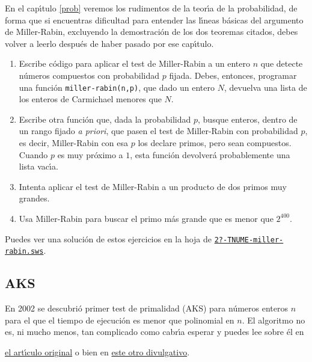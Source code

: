 {\sc En el cap\'{\i}tulo \ref{prob} veremos los rudimentos de la teor\'{\i}a de la probabilidad,} de forma que si  encuentras dificultad para entender las l\'{\i}neas b\'asicas del argumento de Miller-Rabin, excluyendo la demostraci\'on de los dos teoremas citados,  debes volver a leerlo despu\'es de haber pasado por ese cap\'{\i}tulo.

\bigskip

\pagebreak[3]

\begin{ejer}
\begin{enumerate}
\item Escribe c\'odigo para aplicar el test de Miller-Rabin a un entero $n$ que
detecte n\'umeros compuestos con probabilidad $p$ fijada. Debes, entonces,
programar
una funci\'on {\tt miller-rabin(n,p)}, que dado un 
entero $N$,  devuelva una lista
de los enteros de Carmichael menores que $N$.
\item Escribe otra funci\'on que, dada la probabilidad $p$,  busque enteros,
dentro de un rango fijado {\itshape a priori},  que pasen el test de
Miller-Rabin con probabilidad $p$, es decir,
Miller-Rabin con esa $p$ los declare primos, pero sean compuestos. Cuando $p$ es
muy pr\'oximo a $1$, esta funci\'on devolver\'a probablemente una lista
vac\'{\i}a. 
\item Intenta aplicar el test de Miller-Rabin a un producto de dos primos muy
grandes. 
\item Usa Miller-Rabin para buscar el primo m\'as grande que es menor que
$2^{400}$.
\end{enumerate}
\bigskip

Puedes ver una soluci\'on de estos ejercicios en la hoja de {\sage}
\href{http://sage.mat.uam.es:8888/home/pub/?/}{\tt 2?-TNUME-miller-rabin.sws}.
\end{ejer}

\subsection{AKS}

En 2002 se descubri\'o primer  test de primalidad (AKS)  para 
n\'umeros enteros $n$ para el que el tiempo de ejecuci\'on es menor que 
polinomial en $n$. El 
algoritmo no es, ni mucho menos, tan complicado como cabr\'{\i}a esperar y 
puedes lee sobre \'el en 

\href{http://150.244.21.37/PDFs/TNUME/primality_v6.pdf}{el art\'{\i}culo original} o bien en 
\href{http://150.244.21.37/PDFs/TNUME/AKS.pdf}{este otro divulgativo}. 

